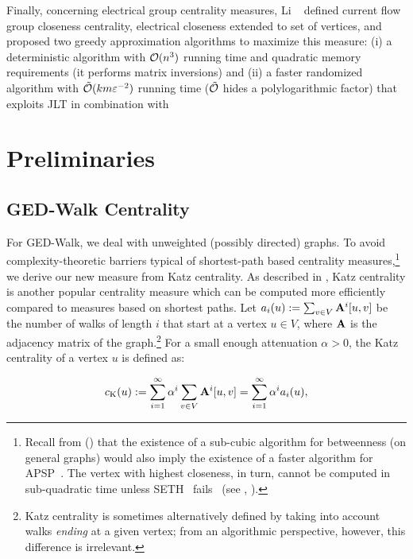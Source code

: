 Finally, concerning electrical group centrality measures, Li
\etal~\cite{DBLP:conf/www/0002PSYZ19} defined current flow group closeness
centrality, \ie electrical closeness extended to set of vertices, and proposed
two greedy approximation algorithms to maximize this measure: (i) a
deterministic algorithm with $\mathcal{O}(n^3)$ running time and quadratic memory
requirements (it performs matrix inversions) and (ii) a faster randomized
algorithm with $\tilde{\mathcal{O}}(km\varepsilon^{-2})$ running time ($\tilde{\mathcal{O}}$ hides
a polylogarithmic factor) that exploits JLT in combination with

\section{Preliminaries}
\subsection{GED-Walk Centrality}
%
For GED-Walk, we deal with unweighted (possibly directed) graphs.
%
To avoid complexity-theoretic barriers typical of shortest-path based centrality
measures,\footnote{Recall from  ()
that the existence
of a sub-cubic algorithm for betweenness (on general graphs) would also
imply the existence of a faster
algorithm for APSP~\cite{DBLP:conf/soda/AbboudGW15}. The vertex with
highest closeness, in turn, cannot be computed in sub-quadratic time unless
SETH~\cite{DBLP:journals/jcss/ImpagliazzoPZ01}
fails~\cite{DBLP:journals/im/BoldiV14} (see ,
).}
we derive our new measure from Katz centrality. As described in
,
Katz centrality is another popular centrality measure which can be computed more
efficiently compared to measures based on shortest paths.
Let $a_i(u) := \sum_{v \in V}\mathbf{A}^i[u, v]$ be the number of walks
of length $i$ that start at a vertex $u\in V$, where $\mathbf{A}$ is the adjacency
matrix of the graph.\footnote{Katz centrality is sometimes alternatively defined
by taking into account walks \emph{ending} at a given vertex; from an algorithmic
perspective, however, this difference is irrelevant.}
For a small enough attenuation $\alpha > 0$, the Katz
centrality of a vertex $u$ is defined as:

\begin{equation}
\label{eq:ged-walk:katz}
c_{\text{K}}(u) := \sum_{i = 1}^{\infty}\alpha^i \sum_{v \in V}\mathbf{A}^i[u, v] =
\sum_{i = 1}^{\infty}\alpha^i a_i(u),
\end{equation}

